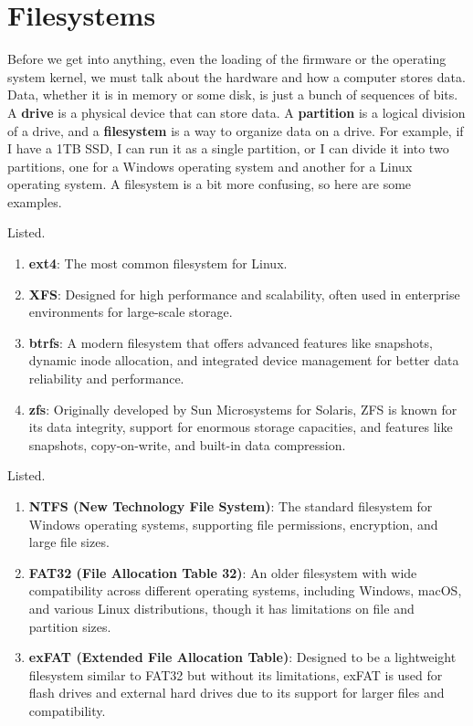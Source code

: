 \documentclass{article}
\begin{document}
    


\section{Filesystems}

  Before we get into anything, even the loading of the firmware or the operating system kernel, we must talk about the hardware and how a computer stores data. Data, whether it is in memory or some disk, is just a bunch of sequences of bits. A \textbf{drive} is a physical device that can store data. A \textbf{partition} is a logical division of a drive, and a \textbf{filesystem} is a way to organize data on a drive. For example, if I have a 1TB SSD, I can run it as a single partition, or I can divide it into two partitions, one for a Windows operating system and another for a Linux operating system. A filesystem is a bit more confusing, so here are some examples. 

  \begin{example}
    Listed. 
    \begin{enumerate}
      \item \textbf{ext4}: The most common filesystem for Linux. 
      \item \textbf{XFS}: Designed for high performance and scalability, often used in enterprise environments for large-scale storage.
      \item \textbf{btrfs}: A modern filesystem that offers advanced features like snapshots, dynamic inode allocation, and integrated device management for better data reliability and performance. 
      \item \textbf{zfs}: Originally developed by Sun Microsystems for Solaris, ZFS is known for its data integrity, support for enormous storage capacities, and features like snapshots, copy-on-write, and built-in data compression.
    \end{enumerate}
  \end{example}

  \begin{example}
    Listed. 
    \begin{enumerate} 
      \item \textbf{NTFS (New Technology File System)}: The standard filesystem for Windows operating systems, supporting file permissions, encryption, and large file sizes.
      \item \textbf{FAT32 (File Allocation Table 32)}: An older filesystem with wide compatibility across different operating systems, including Windows, macOS, and various Linux distributions, though it has limitations on file and partition sizes.
      \item \textbf{exFAT (Extended File Allocation Table)}: Designed to be a lightweight filesystem similar to FAT32 but without its limitations, exFAT is used for flash drives and external hard drives due to its support for larger files and compatibility.
    \end{enumerate}
  \end{example}
\end{document}
